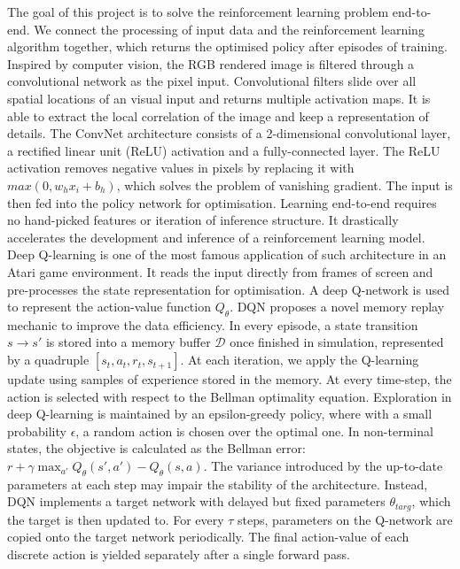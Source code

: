 \documentclass[oneside,11pt,a4paper]{article}
\begin{document}
The goal of this project is to solve the reinforcement learning problem end-to-end. We connect the processing of input data and the reinforcement learning algorithm together, which returns the optimised policy after episodes of training. Inspired by computer vision, the RGB rendered image is filtered through a convolutional network as the pixel input. Convolutional filters slide over all spatial locations of an visual input and returns multiple activation maps. It is able to extract the local correlation of the image and keep a representation of details. The ConvNet architecture consists of a 2-dimensional convolutional layer, a rectified linear unit (ReLU) activation and a fully-connected layer. The ReLU activation removes negative values in pixels by replacing it with $max(0, w_hx_i+b_h)$, which solves the problem of vanishing gradient. The input is then fed into the policy network for optimisation. Learning end-to-end requires no hand-picked features or iteration of inference structure. It drastically accelerates the development and inference of a reinforcement learning model.
\newline
\newline
\noindent
Deep Q-learning is one of the most famous application of such architecture in an Atari game environment. \cite{atari} It reads the input directly from frames of screen and pre-processes the state representation for optimisation. A deep Q-network is used to represent the action-value function $Q_\theta$. DQN proposes a novel memory replay mechanic to improve the data efficiency. In every episode, a state transition $s\rightarrow s'$ is stored into a memory buffer $\mathcal D$ once finished in simulation, represented by a quadruple $[s_t,a_t,r_t,s_{t+1}]$. At each iteration, we apply the Q-learning update using samples of experience stored in the memory. At every time-step, the action is selected with respect to the Bellman optimality equation. Exploration in deep Q-learning is maintained by an epsilon-greedy policy, where with a small probability $\epsilon$, a random action is chosen over the optimal one. In non-terminal states, the objective is calculated as the Bellman error: $r+\gamma\max_{a'}Q_\theta(s',a')-Q_\theta(s,a)$. The variance introduced by the up-to-date parameters at each step may impair the stability of the architecture. Instead, DQN implements a target network with delayed but fixed parameters $\theta_{targ}$, which the target is then updated to. For every $\tau$ steps, parameters on the Q-network are copied onto the target network periodically. The final action-value of each discrete action is yielded separately after a single forward pass.
\newline
\newline
\noindent
\end{document}
